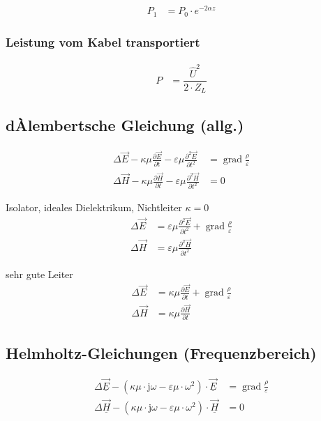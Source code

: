 \begin{align*}
    P_1 & = P_0 \cdot e^{-2\alpha z}
\end{align*}

\subsubsection{Leistung vom Kabel transportiert}

\begin{align*}
    P & = \dfrac{\hat{U}^2}{2\cdot Z_L}
\end{align*}

\subsection{dÀlembertsche Gleichung (allg.)}
\begin{align*}
    \Delta \vec{E}-\kappa \mu \frac{\partial \vec{E}}{\partial t}-\varepsilon \mu \frac{\partial^{2} \vec{E}}{\partial t^{2}} & = \operatorname{grad} \frac{\rho}{\varepsilon} \\
    \Delta \vec{H}-\kappa \mu \frac{\partial \vec{H}}{\partial t}-\varepsilon \mu \frac{\partial^{2} \vec{H}}{\partial t^{2}} & = 0
\end{align*}

Isolator, ideales Dielektrikum, Nichtleiter $\kappa = 0$
\begin{align*}
    \Delta \vec{E} & =\varepsilon \mu \frac{\partial^{2} \vec{E}}{\partial t^{2}}+\operatorname{grad} \frac{\rho}{\varepsilon} \\
    \Delta \vec{H} & =\varepsilon \mu \frac{\partial^{2} \vec{H}}{\partial t^{2}}
\end{align*}

sehr gute Leiter
\begin{align*}
    \Delta \vec{E} & =\kappa \mu \frac{\partial \vec{E}}{\partial t}+\operatorname{grad} \frac{\rho}{\varepsilon} \\
    \Delta \vec{H} & =\kappa \mu \frac{\partial \vec{H}}{\partial t}
\end{align*}

\subsection{Helmholtz-Gleichungen (Frequenzbereich)}
\begin{align*}
    \Delta \underline{\vec{E}}-\left(\kappa \mu \cdot \mathrm{j} \omega-\varepsilon \mu \cdot \omega^{2}\right) \cdot \underline{\vec{E}} & = \operatorname{grad} \frac{\rho}{\varepsilon} \\
    \Delta \underline{\vec{H}}-\left(\kappa \mu \cdot \mathrm{j} \omega-\varepsilon \mu \cdot \omega^{2}\right) \cdot \underline{\vec{H}} & = 0
\end{align*}

